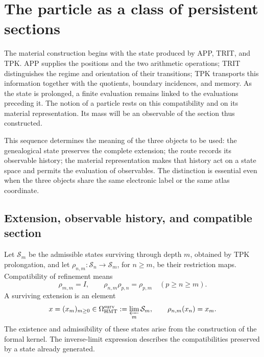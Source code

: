 \section{The particle as a class of persistent sections}
\label{vi:sec:particula}

The material construction begins with the state produced by APP, TRIT, and
TPK. APP supplies the positions and the two arithmetic operations;
TRIT distinguishes the regime and orientation of their transitions; TPK
transports this information together with the quotients, boundary incidences,
and memory. As the state is prolonged, a finite evaluation
remains linked to the evaluations preceding it. The notion of a
particle rests on this compatibility and on its material representation.
Its mass will be an observable of the section thus constructed.

This sequence determines the meaning of the three objects to be
used: the genealogical state preserves the complete extension; the route
records its observable history; the material representation makes
that history act on a state space and permits the evaluation of observables.
The distinction is essential even when the three objects share
the same electronic label or the same atlas coordinate.

\subsection{Extension, observable history, and compatible section}
\label{vi:subsec:extension-persistente}

Let $\mathcal S_m$ be the admissible states surviving through depth
$m$, obtained by TPK prolongation, and let
$\rho_{n,m}:\mathcal S_n\to\mathcal S_m$, for $n\geq m$, be their
restriction maps. Compatibility of refinement means
\begin{equation}
 \rho_{m,m}=I,\qquad
 \rho_{n,m}\rho_{p,n}=\rho_{p,m}\quad(p\geq n\geq m).
 \label{vi:eq:sistema-estados}
\end{equation}
A surviving extension is an element
\begin{equation}
 x=(x_m)_{m\geq0}\in\Omega^{\mathrm{surv}}_{\mathrm{HMT}}
 :=\varprojlim_m\mathcal S_m,
 \qquad \rho_{n,m}(x_n)=x_m.
 \label{vi:eq:extension-superviviente}
\end{equation}
The existence and admissibility of these states arise from the
construction of the formal kernel. The inverse-limit expression describes
the compatibilities preserved by a state already generated.

